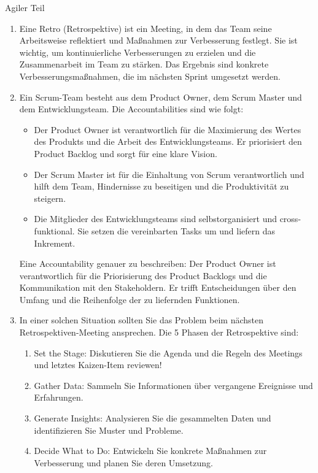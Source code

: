 \documentclass{article}
\begin{document}
\begin{exercise}{Agiler Teil}
  \begin{solution}
    \begin{enumerate}
      \item Eine Retro (Retrospektive) ist ein Meeting, in dem das Team seine Arbeitsweise reflektiert und Maßnahmen zur Verbesserung festlegt. Sie ist wichtig, um kontinuierliche Verbesserungen zu erzielen und die Zusammenarbeit im Team zu stärken. Das Ergebnis sind konkrete Verbesserungsmaßnahmen, die im nächsten Sprint umgesetzt werden.
      \item Ein Scrum-Team besteht aus dem Product Owner, dem Scrum Master und dem Entwicklungsteam. Die Accountabilities sind wie folgt:
            \begin{itemize}
              \item Der Product Owner ist verantwortlich für die Maximierung des Wertes des Produkts und die Arbeit des Entwicklungsteams. Er priorisiert den Product Backlog und sorgt für eine klare Vision.
              \item Der Scrum Master ist für die Einhaltung von Scrum verantwortlich und hilft dem Team, Hindernisse zu beseitigen und die Produktivität zu steigern.
              \item Die Mitglieder des Entwicklungsteams sind selbstorganisiert und cross-funktional. Sie setzen die vereinbarten Tasks um und liefern das Inkrement.
            \end{itemize}
            Eine Accountability genauer zu beschreiben: Der Product Owner ist verantwortlich für die Priorisierung des Product Backlogs und die Kommunikation mit den Stakeholdern. Er trifft Entscheidungen über den Umfang und die Reihenfolge der zu liefernden Funktionen.
      \item In einer solchen Situation sollten Sie das Problem beim nächsten Retrospektiven-Meeting ansprechen. Die 5 Phasen der Retrospektive sind:
            \begin{enumerate}
              \item Set the Stage: Diskutieren Sie die Agenda und die Regeln des Meetings und letztes Kaizen-Item reviewen!
              \item Gather Data: Sammeln Sie Informationen über vergangene Ereignisse und Erfahrungen.
              \item Generate Insights: Analysieren Sie die gesammelten Daten und identifizieren Sie Muster und Probleme.
              \item Decide What to Do: Entwickeln Sie konkrete Maßnahmen zur Verbesserung und planen Sie deren Umsetzung.

\end{enumerate}
\end{enumerate}
\end{solution}
\end{exercise}
\end{document}
